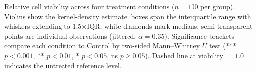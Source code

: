 \caption{Relative cell viability across four treatment conditions ($n=100$ per group).
Violins show the kernel-density estimate; boxes span the interquartile range with whiskers
extending to 1.5$\times$IQR; white diamonds mark medians; semi-transparent points are
individual observations (jittered, $\alpha=0.35$).
Significance brackets compare each condition to Control by two-sided Mann--Whitney $U$ test
(*** $p<0.001$, ** $p<0.01$, * $p<0.05$, ns $p\geq0.05$).
Dashed line at viability $= 1.0$ indicates the untreated reference level.}
